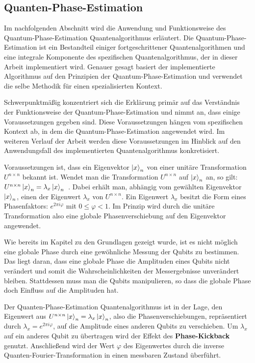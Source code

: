 \subsection{Quanten-Phase-Estimation} \label{Quanten-Phase-Estimation}

Im nachfolgenden Abschnitt wird die Anwendung und Funktionsweise des Quantum-Phase-Estimation Quantenalgorithmus erläutert. 
Die Quantum-Phase-Estimation ist ein Bestandteil einiger fortgeschrittener Quantenalgorithmen und eine integrale Komponente des spezifischen Quantenalgorithmus, 
der in dieser Arbeit implementiert wird. 
Genauer gesagt basiert der implementierte Algorithmus auf den Prinzipien der Quantum-Phase-Estimation und verwendet die selbe Methodik für einen spezialisierten Kontext.

Schwerpunktmäßig konzentriert sich die Erklärung primär auf das Verständnis der Funktionsweise der Quantum-Phase-Estimation und nimmt an, dass einige Voraussetzungen gegeben sind. 
Diese Voraussetzungen hängen vom spezifischen Kontext ab, 
in dem die Quantum-Phase-Estimation angewendet wird. 
Im weiteren Verlauf der Arbeit werden diese Voraussetzungen im Hinblick auf den Anwendungsfall des implementierten Quantenalgorithmus konkretisiert.

Voraussetzungen ist, dass ein Eigenvektor \(\ket{x}_n\) von einer unitäre Transformation \(U^{n\times n}\) bekannt ist.
Wendet man die Transformation \(U^{n\times n}\) auf \(\ket{x}_n\) an, 
so gilt: \(U^{n\times n}\ket{x}_n=\lambda_x\ket{x}_n\)~\cite{nielsen_chuang_2010}.
Dabei erhält man, abhängig vom gewählten Eigenvektor \(\ket{x}_n\), einen der Eigenwert \(\lambda_x\) von \(U^{n\times n}\).
Ein Eigenwert \(\lambda_x\) besitzt die Form eines Phasenfaktors: \(e^{2\pi i \varphi}\)
mit \(0 \leq \varphi < 1\).
Im Prinzip wird durch die unitäre Transformation also eine globale Phasenverschiebung auf den Eigenvektor angewendet.

Wie bereits im Kapitel zu den Grundlagen gezeigt wurde, 
ist es nicht möglich eine globale Phase durch eine gewöhnliche Messung der Qubits zu bestimmen. 
Das liegt daran, 
dass eine globale Phase die Amplituden eines Qubits nicht verändert und somit die Wahrscheinlichkeiten der Messergebnisse unverändert bleiben.
Stattdessen muss man die Qubits manipulieren, so dass die globale Phase doch Einfluss auf die Amplituden hat.

Der Quanten-Phase-Estimation Quantenalgorithmus ist in der Lage, 
den Eigenwert aus \(U^{n\times n}\ket{x}_n=\lambda_x\ket{x}_n\), also die Phasenverschiebungen, repräsentiert durch \(\lambda_x = e^{2\pi i \varphi}\),
auf die Amplitude eines anderen Qubits zu verschieben.
Um \(\lambda_x\) auf ein anderes Qubit zu übertragen wird der Effekt des \textbf{Phase-Kickback} genutzt.
Anschließend wird der Wert \(\varphi\) des Eigenwertes durch die inverse Quanten-Fourier-Transformation in einen messbaren Zustand überführt.

